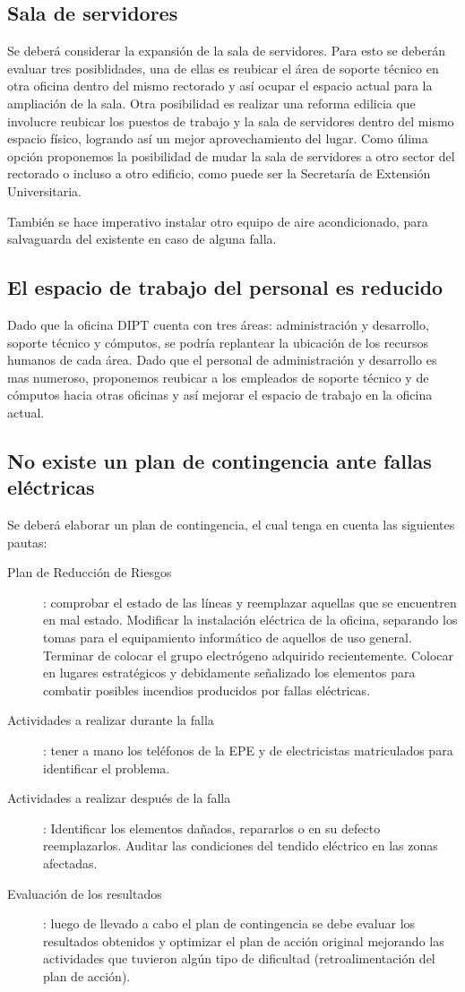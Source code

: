 \documentclass[a4paper,11pt,oneside]{article}
\begin{document}
\subsection{Sala de servidores}
Se deberá considerar la expansión de la sala de servidores. Para esto
se deberán evaluar tres posiblidades, una de ellas es reubicar el área
de soporte técnico en otra oficina dentro del mismo rectorado y así
ocupar el espacio actual para la ampliación de la sala.
Otra posibilidad es realizar una reforma edilicia que involucre
reubicar los puestos de trabajo y la sala de servidores dentro del
mismo espacio físico, logrando así un mejor aprovechamiento del lugar.
Como úlima opción proponemos la posibilidad de mudar la sala de
servidores a otro sector del rectorado o incluso a otro edificio, como
puede ser la Secretaría de Extensión Universitaria.

También se hace imperativo instalar otro equipo de aire acondicionado,
para salvaguarda del existente en caso de alguna falla.
%
\subsection{El espacio de trabajo del personal es reducido}
Dado que la oficina DIPT cuenta con tres áreas: administración y
desarrollo, soporte técnico y cómputos, se podría replantear la
ubicación de los recursos humanos de cada área. Dado que el personal
de administración y desarrollo es mas numeroso, proponemos reubicar a
los empleados de soporte técnico y de cómputos hacia otras oficinas y
así mejorar el espacio de trabajo en la oficina actual.
%
\newpage
\subsection{No existe un plan de contingencia ante fallas eléctricas}
Se deberá elaborar un plan de contingencia, el cual tenga en cuenta
las siguientes pautas:
\begin{description}
\item [Plan de Reducción de Riesgos]: comprobar el estado de las
  líneas y reemplazar aquellas que se encuentren en mal
  estado. Modificar la instalación eléctrica de la oficina, separando
  los tomas para el equipamiento informático de aquellos de uso
  general. Terminar de colocar el grupo electrógeno adquirido
  recientemente. Colocar en lugares estratégicos y debidamente
  señalizado los elementos para combatir posibles incendios producidos
  por fallas eléctricas.
\item [Actividades a realizar durante la falla]: tener a mano los
  teléfonos de la EPE y de electricistas matriculados para identificar
  el problema.
\item [Actividades a realizar después de la falla]: Identificar los
  elementos dañados, repararlos o en su defecto reemplazarlos. Auditar
  las condiciones del tendido eléctrico en las zonas afectadas.
\item [Evaluación de los resultados]: luego de llevado a cabo el plan
  de contingencia se debe evaluar los resultados obtenidos y optimizar
  el plan de acción original mejorando las actividades que tuvieron
  algún tipo de dificultad (retroalimentación del plan de acción).
\end{description}
%
\end{document}
